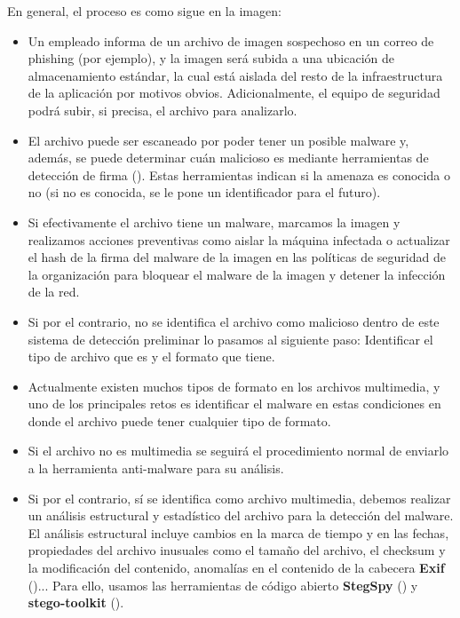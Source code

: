 En general, el proceso es como sigue en la imagen:


\begin{itemize}
\item Un empleado informa de un archivo de imagen sospechoso en un correo de phishing (por ejemplo), y la imagen será subida a una ubicación de almacenamiento estándar, la cual está aislada del resto de la infraestructura de la aplicación por motivos obvios. Adicionalmente, el equipo de seguridad podrá subir, si precisa, el archivo para analizarlo.
\item El archivo puede ser escaneado por poder tener un posible malware y, además, se puede determinar cuán malicioso es mediante herramientas de detección de firma (\cite{signature-based-detection}). Estas herramientas indican si la amenaza es conocida o no (si no es conocida, se le pone un identificador para el futuro). %
\item Si efectivamente el archivo tiene un malware, marcamos la imagen y realizamos acciones preventivas como aislar la máquina infectada o actualizar el hash de la firma del malware de la imagen en las políticas de seguridad de la organización para bloquear el malware de la imagen y detener la infección de la red.
\item Si por el contrario, no se identifica el archivo como malicioso dentro de este sistema de detección preliminar lo pasamos al siguiente paso: Identificar el tipo de archivo que es y el formato que tiene.
\item Actualmente existen muchos tipos de formato en los archivos multimedia, y uno de los principales retos es identificar el malware en estas condiciones en donde el archivo puede tener cualquier tipo de formato.
\item Si el archivo no es multimedia se seguirá el procedimiento normal de enviarlo a la herramienta anti-malware para su análisis.
\item Si por el contrario, sí se identifica como archivo multimedia, debemos realizar un análisis estructural y estadístico del archivo para la detección del malware. El análisis estructural incluye cambios en la marca de tiempo y en las fechas, propiedades del archivo inusuales como el tamaño del archivo, el checksum y la modificación del contenido, anomalías en el contenido de la cabecera \textbf{Exif} (\cite{exif-header})... Para ello, usamos las herramientas de código abierto \textbf{StegSpy} (\cite{stegspy}) y \textbf{stego-toolkit} (\cite{stego-toolkit}). %

\end{itemize}
